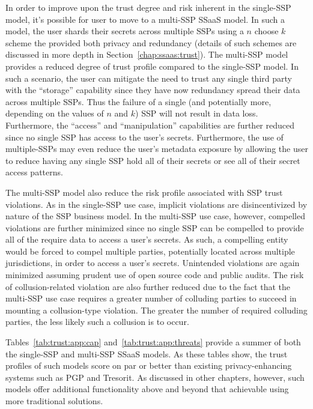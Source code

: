 In order to improve upon the trust degree and risk inherent in the
single-SSP model, it's possible for user to move to a multi-SSP SSaaS
model. In such a model, the user shards their secrets across multiple
SSPs using a $n$ choose $k$ scheme the provided both privacy and
redundancy (details of such schemes are discussed in more depth in
Section~\ref{chap:ssaas:trust}). The multi-SSP model provides a
reduced degree of trust profile compared to the single-SSP model. In
such a scenario, the user can mitigate the need to trust any single
third party with the ``storage'' capability since they have now
redundancy spread their data across multiple SSPs. Thus the failure of
a single (and potentially more, depending on the values of $n$ and
$k$) SSP will not result in data loss. Furthermore, the ``access'' and
``manipulation'' capabilities are further reduced since no single SSP
has access to the user's secrets. Furthermore, the use of
multiple-SSPs may even reduce the user's metadata exposure by allowing
the user to reduce having any single SSP hold all of their secrets or
see all of their secret access patterns.

The multi-SSP model also reduce the risk profile associated with SSP
trust violations. As in the single-SSP use case, implicit violations
are disincentivized by nature of the SSP business model. In the
multi-SSP use case, however, compelled violations are further
minimized since no single SSP can be compelled to provide all of the
require data to access a user's secrets. As such, a compelling entity
would be forced to compel multiple parties, potentially located across
multiple jurisdictions, in order to access a user's
secrets. Unintended violations are again minimized assuming prudent
use of open source code and public audits. The risk of
collusion-related violation are also further reduced due to the fact
that the multi-SSP use case requires a greater number of colluding
parties to succeed in mounting a collusion-type violation. The greater
the number of required colluding parties, the less likely such a
collusion is to occur.

Tables~\ref{tab:trust:app:cap} and~\ref{tab:trust:app:threats} provide
a summer of both the single-SSP and multi-SSP SSaaS models. As these
tables show, the trust profiles of such models score on par or better
than existing privacy-enhancing systems such as PGP and Tresorit. As
discussed in other chapters, however, such models offer additional
functionality above and beyond that achievable using more traditional
solutions.

